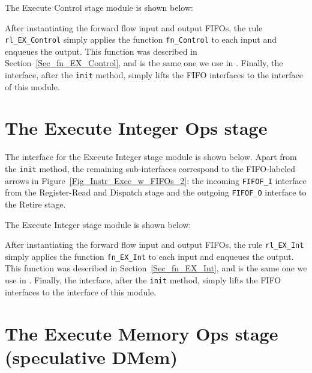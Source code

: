 
The Execute Control stage module is shown below:


After instantiating the forward flow input and output FIFOs, the rule
\verb|rl_EX_Control| simply applies the function \verb|fn_Control| to
each input and enqueues the output.  This function was described in
Section~\ref{Sec_fn_EX_Control}, and is the same one we use in {\DRUM}.
Finally, the interface, after the \verb|init| method, simply lifts the
FIFO interfaces to the interface of this module.


\section{The Execute Integer Ops stage}

\label{Sec_Fife_EX_Int_stage}

The interface for the Execute Integer stage module is shown below.
Apart from the \verb|init| method, the remaining sub-interfaces
correspond to the FIFO-labeled arrows in
Figure~\ref{Fig_Instr_Exec_w_FIFOs_2}: the incoming \verb|FIFOF_I|
interface from the Register-Read and Dispatch stage and the outgoing
\verb|FIFOF_O| interface to the Retire stage.


The Execute Integer stage module is shown below:


After instantiating the forward flow input and output FIFOs, the rule
\verb|rl_EX_Int| simply applies the function \verb|fn_EX_Int| to each
input and enqueues the output.  This function was described in
Section~\ref{Sec_fn_EX_Int}, and is the same one we use in {\DRUM}.
Finally, the interface, after the \verb|init| method, simply lifts the
FIFO interfaces to the interface of this module.


\section{The Execute Memory Ops stage (speculative DMem)}

\label{Sec_Fife_DMem_stage}

